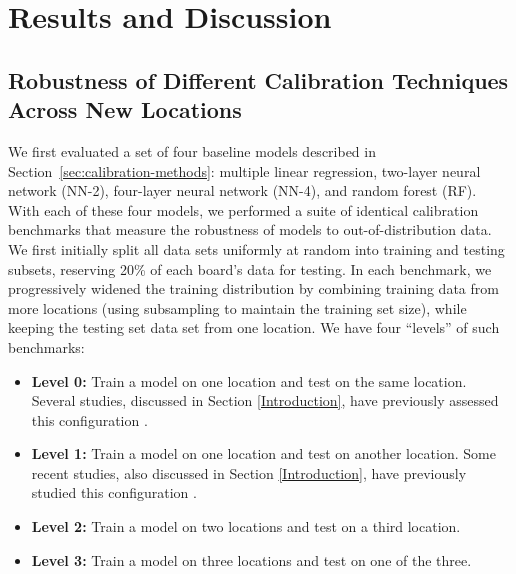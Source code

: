 \documentclass[journal abbreviation, manuscript]{copernicus}
\begin{document}
\section{Results and Discussion}

\subsection{Robustness of Different Calibration Techniques Across New Locations}
We first evaluated a set of four baseline models described in Section~\ref{sec:calibration-methods}: multiple linear regression, two-layer neural network (NN-2), four-layer neural network (NN-4), and random forest (RF). With each of these four models, we performed a suite of identical calibration benchmarks that measure the robustness of models to out-of-distribution data. We first initially split all data sets uniformly at random into training and testing subsets, reserving 20\% of each board's data for testing.  In each benchmark, we progressively widened the training distribution by combining training data from more locations (using subsampling to maintain the training set size), while keeping the testing set data set from one location.  We have four ``levels'' of such benchmarks:
\begin{itemize}
    \item \textbf{Level 0:} Train a model on one location and test on the same location.  Several studies, discussed in Section \ref{Introduction}, have previously assessed this configuration \citep{Zimmerman2018,Spinelle2015,SPINELLE2017706,Cross2017}.
    \item \textbf{Level 1:} Train a model on one location and test on another location.  Some recent studies, also discussed in Section \ref{Introduction}, have previously studied this configuration \citep{Hagan2018, Casey2018testing, Malings2018development,Bigi2018performance}.
    \item \textbf{Level 2:} Train a model on two locations and test on a third location.
    \item \textbf{Level 3:} Train a model on three locations and test on one of the three.
\end{itemize}
\end{document}
